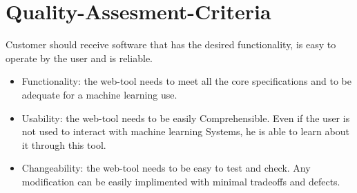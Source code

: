 
\section{Quality-Assesment-Criteria }

Customer should receive software that has the desired functionality, is easy to operate by the user and is reliable.


%
\newpage

\begin{itemize}
  \item  Functionality: the web-tool needs to meet all the core specifications and to be adequate for a machine learning use.
  \item  Usability: the web-tool needs to be easily Comprehensible. Even if the user is not used to interact with machine learning Systems, he is able to learn about it through this tool.
 \item   Changeability: the web-tool needs to be easy to test and check. Any modification can be easily implimented with minimal tradeoffs and defects.
\end{itemize}



   
    